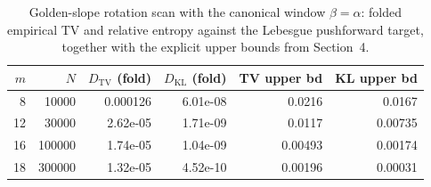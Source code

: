 \begin{table}[H]
\centering
\small
\begin{tabular}{rrrrrr}
\toprule
$m$ & $N$ & $D_{\mathrm{TV}}$ (fold) & $D_{\mathrm{KL}}$ (fold) & TV upper bd & KL upper bd\\
\midrule
8 & 10000 & 0.000126 & 6.01e-08 & 0.0216 & 0.0167\\
12 & 30000 & 2.62e-05 & 1.71e-09 & 0.0117 & 0.00735\\
16 & 100000 & 1.74e-05 & 1.04e-09 & 0.00493 & 0.00174\\
18 & 300000 & 1.32e-05 & 4.52e-10 & 0.00196 & 0.00031\\
\bottomrule
\end{tabular}
\caption{Golden-slope rotation scan with the canonical window $\beta=\alpha$:
folded empirical TV and relative entropy against the Lebesgue pushforward
target, together with the explicit upper bounds from Section~4.}
\label{tab:rotation-folded-kl-certificate}
\end{table}
